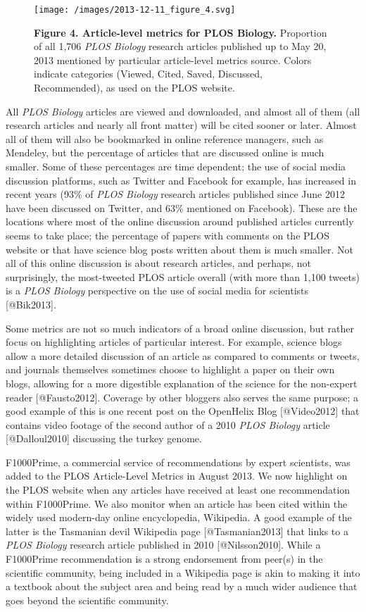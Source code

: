 \begin{figure}[htbp]
\centering
\texttt{[image: /images/2013-12-11\_figure\_4.svg]}
\caption{\textbf{Figure 4. Article-level metrics for PLOS Biology.}
Proportion of all 1,706 \emph{PLOS Biology} research articles published
up to May 20, 2013 mentioned by particular article-level metrics source.
Colors indicate categories (Viewed, Cited, Saved, Discussed,
Recommended), as used on the PLOS website.}
\end{figure}

All \emph{PLOS Biology} articles are viewed and downloaded, and almost
all of them (all research articles and nearly all front matter) will be
cited sooner or later. Almost all of them will also be bookmarked in
online reference managers, such as Mendeley, but the percentage of
articles that are discussed online is much smaller. Some of these
percentages are time dependent; the use of social media discussion
platforms, such as Twitter and Facebook for example, has increased in
recent years (93\% of \emph{PLOS Biology} research articles published
since June 2012 have been discussed on Twitter, and 63\% mentioned on
Facebook). These are the locations where most of the online discussion
around published articles currently seems to take place; the percentage
of papers with comments on the PLOS website or that have science blog
posts written about them is much smaller. Not all of this online
discussion is about research articles, and perhaps, not surprisingly,
the most-tweeted PLOS article overall (with more than 1,100 tweets) is a
\emph{PLOS Biology} perspective on the use of social media for
scientists {[}@Bik2013{]}.

Some metrics are not so much indicators of a broad online discussion,
but rather focus on highlighting articles of particular interest. For
example, science blogs allow a more detailed discussion of an article as
compared to comments or tweets, and journals themselves sometimes choose
to highlight a paper on their own blogs, allowing for a more digestible
explanation of the science for the non-expert reader {[}@Fausto2012{]}.
Coverage by other bloggers also serves the same purpose; a good example
of this is one recent post on the OpenHelix Blog {[}@Video2012{]} that
contains video footage of the second author of a 2010 \emph{PLOS
Biology} article {[}@Dalloul2010{]} discussing the turkey genome.

F1000Prime, a commercial service of recommendations by expert
scientists, was added to the PLOS Article-Level Metrics in August 2013.
We now highlight on the PLOS website when any articles have received at
least one recommendation within F1000Prime. We also monitor when an
article has been cited within the widely used modern-day online
encyclopedia, Wikipedia. A good example of the latter is the Tasmanian
devil Wikipedia page {[}@Tasmanian2013{]} that links to a \emph{PLOS
Biology} research article published in 2010 {[}@Nilsson2010{]}. While a
F1000Prime recommendation is a strong endorsement from peer(s) in the
scientific community, being included in a Wikipedia page is akin to
making it into a textbook about the subject area and being read by a
much wider audience that goes beyond the scientific community.

